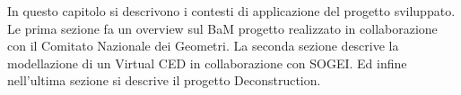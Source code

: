 In questo capitolo si descrivono i contesti di applicazione del progetto sviluppato.
Le prima sezione fa un overview sul BaM progetto realizzato
in collaborazione con il Comitato Nazionale dei Geometri.
La seconda sezione descrive la modellazione di un Virtual CED in collaborazione con SOGEI.
Ed infine nell'ultima sezione si descrive il progetto Deconstruction.
